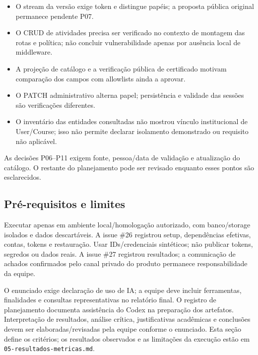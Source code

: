 \begin{itemize}
\tightlist
\item
  O stream da versão exige token e distingue papéis; a proposta pública
  original permanece pendente P07.
\item
  O CRUD de atividades precisa ser verificado no contexto de montagem
  das rotas e política; não concluir vulnerabilidade apenas por ausência
  local de middleware.
\item
  A projeção de catálogo e a verificação pública de certificado motivam
  comparação dos campos com allowlists ainda a aprovar.
\item
  O PATCH administrativo alterna papel; persistência e validade das
  sessões são verificações diferentes.
\item
  O inventário das entidades consultadas não mostrou vínculo
  institucional de User/\allowbreak{}Course; isso não permite declarar isolamento
  demonstrado ou requisito não aplicável.
\end{itemize}

As decisões P06--P11 exigem fonte, pessoa/\allowbreak{}data de validação e
atualização do catálogo. O restante do planejamento pode ser revisado
enquanto esses pontos são esclarecidos.

\subsection{Pré-requisitos e limites}\label{pruxe9-requisitos-e-limites}

Executar apenas em ambiente local/\allowbreak{}homologação autorizado, com
banco/\allowbreak{}storage isolados e dados descartáveis. A issue \#26 registrou
setup, dependências efetivas, contas, tokens e restauração. Usar
IDs/\allowbreak{}credenciais sintéticos; não publicar tokens, segredos ou dados
reais. A issue \#27 registrou resultados; a comunicação de achados
confirmados pelo canal privado do produto permanece responsabilidade da
equipe.

O enunciado exige declaração de uso de IA; a equipe deve incluir
ferramentas, finalidades e consultas representativas no relatório final.
O registro de planejamento documenta assistência do Codex na preparação
dos artefatos. Interpretação de resultados, análise crítica,
justificativas acadêmicas e conclusões devem ser elaboradas/\allowbreak{}revisadas
pela equipe conforme o enunciado. Esta seção define os critérios; os
resultados observados e as limitações da execução estão em
\texttt{05-resultados-metricas.md}.

